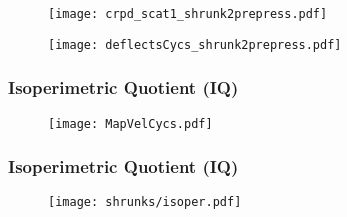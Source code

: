 \begin{frame}
\begin{figure}
	\centering
	\texttt{[image: crpd\_scat1\_shrunk2prepress.pdf]}
\end{figure}
\end{frame}
\begin{frame}
\begin{figure}
	\centering
	\texttt{[image: deflectsCycs\_shrunk2prepress.pdf]}
\end{figure}
\end{frame}



\begin{frame}
 \frametitle{Isoperimetric Quotient (IQ)}
\begin{figure}
	\centering
	\texttt{[image: MapVelCycs.pdf]}
\end{figure}
\end{frame}

\begin{frame}
 \frametitle{Isoperimetric Quotient (IQ)}
\begin{figure}
	\texttt{[image: shrunks/isoper.pdf]}
\end{figure}
\end{frame}


